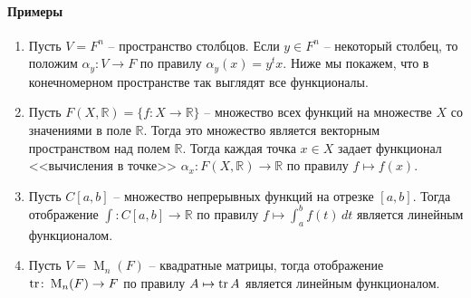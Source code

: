 \paragraph{Примеры}

\begin{enumerate}
\item Пусть $V = F^n$ -- пространство столбцов.
Если $y\in F^n$ -- некоторый столбец, то положим $\alpha_y \colon V\to F$ по правилу $\alpha_y(x) = y^t x$.
Ниже мы покажем, что в конечномерном пространстве так выглядят все функционалы.

\item Пусть $F(X, \mathbb R) = \{f\colon X\to \mathbb R\}$ -- множество всех функций на множестве $X$ со значениями в поле $\mathbb R$.
Тогда это множество является векторным пространством над полем $\mathbb R$.
Тогда каждая точка $x\in X$ задает функционал <<вычисления в точке>> $\alpha_x \colon F(X,\mathbb R)\to \mathbb R$ по правилу $f\mapsto f(x)$.

\item Пусть $C[a,b]$ -- множество непрерывных функций на отрезке $[a,b]$.
Тогда отображение $\int \colon C[a,b]\to \mathbb R$ по правилу $f \mapsto \int_a^b f(t)\,dt$ является линейным функционалом.

\item Пусть $V = \operatorname{M}_n(F)$ -- квадратные матрицы, тогда отображение $\operatorname{tr}\colon \operatorname{M}_n(F)\to F$ по правилу $A\mapsto \operatorname{tr} A$ является линейным функционалом.
\end{enumerate}


